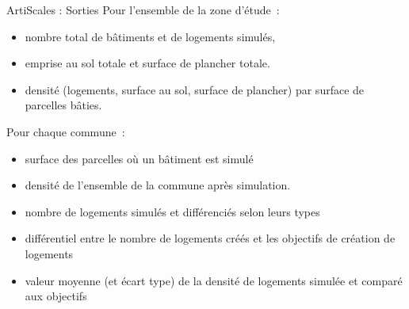 \documentclass[xcolor=table]{beamer}
\begin{document}
\begin{frame}{ArtiScales : Sorties}
Pour l'ensemble de la zone d'étude~:
\begin{itemize}
	\footnotesize
	\item nombre total de bâtiments et de logements simulés, %
	\item emprise au sol totale et surface de plancher totale.
	\item densité (logements, surface au sol, surface de plancher) par surface de parcelles bâties.
\end{itemize}
Pour chaque commune~:
\begin{itemize}
	\item surface des parcelles où un bâtiment est simulé
	\item densité de l'ensemble de la commune après simulation.
	\item nombre de logements simulés et différenciés selon leurs types
	\item différentiel entre le nombre de logements créés et les objectifs de création de logements
	\item valeur moyenne (et écart type) de la densité de logements simulée et comparé aux objectifs
\end{itemize}
\end{frame}
\end{document}
